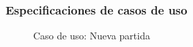 \documentclass[12pt,twoside]{article}
\begin{document}
	
	
	\subsubsection{Especificaciones de casos de uso}
	
	\begin{figure}[H]
		\centering
		\caption{Caso de uso:  Nueva partida}
		\label{diagrama: caso: nueva_partida}
	\end{figure}
	
\end{document}
